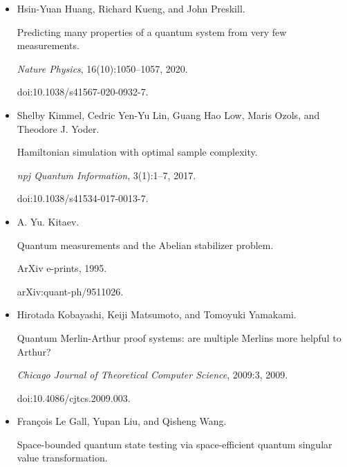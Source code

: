 \documentclass[10pt,a4paper]{article}
\begin{document}
\begin{itemize}
doi:10.1016/0047-259X(73)90028-6.





\item[] 
[25]

Hsin-Yuan Huang, Richard Kueng, and John Preskill.


Predicting many properties of a quantum system from very few
measurements.


\emph{Nature Physics}, 16(10):1050–1057, 2020.


doi:10.1038/s41567-020-0932-7.





\item[] 
[26]

Shelby Kimmel, Cedric Yen-Yu Lin, Guang Hao Low, Maris Ozols, and Theodore J.
Yoder.


Hamiltonian simulation with optimal sample complexity.


\emph{npj Quantum Information}, 3(1):1–7, 2017.


doi:10.1038/s41534-017-0013-7.





\item[] 
[27]

A. Yu. Kitaev.


Quantum measurements and the Abelian stabilizer problem.


ArXiv e-prints, 1995.


arXiv:quant-ph/9511026.





\item[] 
[28]

Hirotada Kobayashi, Keiji Matsumoto, and Tomoyuki Yamakami.


Quantum Merlin-Arthur proof systems: are multiple Merlins more
helpful to Arthur?


\emph{Chicago Journal of Theoretical Computer Science}, 2009:3, 2009.


doi:10.4086/cjtcs.2009.003.





\item[] 
[29]

François Le Gall, Yupan Liu, and Qisheng Wang.


Space-bounded quantum state testing via space-efficient quantum
singular value transformation.



\end{itemize}
\end{document}
